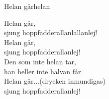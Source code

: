 \begin{song}{Helan går}{helan}
\begin{vers}
Helan går,\\
sjung hoppfadderallanlallanlej!\\
Helan går,\\
sjung hoppfadderallanlej!\\
Den som inte helan tar,\\
han heller inte halvan får.\\
Helan går...(drycken inmundigas)\\
sjung hoppfadderallanlej!\\
\end{vers}
\end{song}
